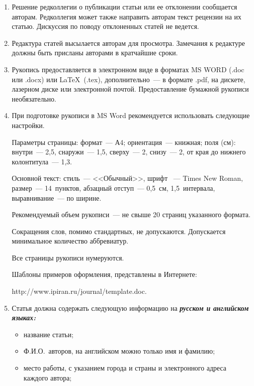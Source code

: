 {\begin{enumerate}[1.]
Возвращение рукописи на доработку не означает ее принятия к печати.  

Доработанный вариант с ответом на замечания рецензента необходимо прислать в 
редакцию. 

\item Решение редколлегии о публикации статьи или ее отклонении сообщается авторам.  
Редколлегия может также направить авторам текст рецензии на их статью. Дискуссия по 
поводу отклоненных статей не ведется. 

\item Редактура статей высылается авторам для просмотра. Замечания к редактуре должны 
быть присланы авторами в кратчайшие сроки. 

\item Рукопись предоставляется в электронном виде в форматах MS WORD (.doc или 
.docx) или \LaTeX\ (.tex), дополнительно~--- в формате .pdf, на дискете, лазерном диске 
или электронной почтой. Предоставление бумажной рукописи необязательно.

\item При подготовке рукописи в MS Word рекомендуется использовать следующие 
настройки.

Параметры страницы:  
формат~--- А4; ориентация~--- книжная; поля (см): внутри~--- 2,5, снаружи~--- 1,5, 
сверху~--- 2, снизу~--- 2, от края до нижнего колонтитула~--- 1,3.  

Основной текст: стиль~--- <<Обычный>>, шрифт ~--- Times New Roman, размер~--- 
14~пунктов, абзацный отступ~--- 0,5~см, 1,5~интервала, выравнивание~--- по ширине.  
 
Рекомендуемый объем рукописи~--- не свыше 20 страниц указанного формата.  

Сокращения слов, помимо стандартных, не допускаются. Допускается минимальное 
количество аббревиатур. 

Все страницы рукописи нумеруются. 

Шаблоны примеров оформления, представлены в Интернете: 

{\sf http://www.ipiran.ru/journal/template.doc}.

\item Статья должна содержать следующую информацию на {\bfseries\textit{русском и 
английском языках:}} 
\begin{itemize}
\item название статьи; 
\item Ф.И.О.\ авторов, на английском можно только имя и фамилию;
\item место работы, с указанием города и страны и электронного адреса каждого 
автора; 


\end{itemize}
\end{enumerate}}
